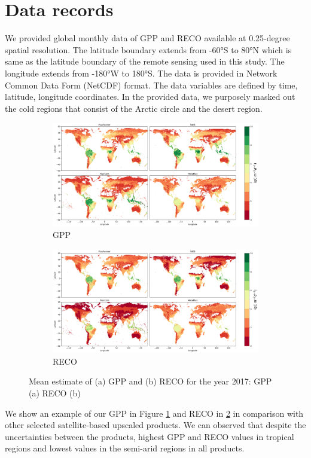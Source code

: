 \section{Data records}
We provided global monthly data of GPP and RECO available at 0.25-degree spatial resolution. The latitude boundary extends from -60°S to 80°N which is same as the latitude boundary of the remote sensing used in this study. The longitude extends from -180°W to 180°S. The data is provided in Network Common Data Form (NetCDF) format. The data variables are defined by time, latitude, longitude coordinates. In the provided data, we purposely masked out the cold regions that consist of the Arctic circle and the desert region. \par
\begin{figure}[tbh!]
    \centering
    \begin{subfigure}{\textwidth}
      \centering
      \includegraphics[width=\textwidth]{figs/chap6/GPP_2017_mean.png}
      \caption{GPP}
      \label{fig:chap6_fig2a}
    \end{subfigure}

    \begin{subfigure}{\textwidth}
      \centering
      \includegraphics[width=\textwidth]{figs/chap6/RECO_2017_mean.png}
      \caption{RECO}
      \label{fig:chap6_fig2b}
    \end{subfigure}
    \caption[Mean estimate of GPP and RECO in 2017]{Mean estimate of (a) GPP and (b) RECO for the year 2017: GPP (a) RECO (b)}
    \label{fig:chap6_fig2}
\end{figure}
We show an example of our GPP in Figure \ref{fig:chap6_fig2a} and RECO in \ref{fig:chap6_fig2b} in comparison with other selected satellite-based upscaled products. We can observed that despite the uncertainties between the products, highest GPP and RECO values in tropical regions and lowest values in the semi-arid regions in all products. \par

